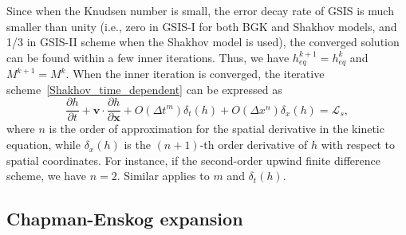 \documentclass[onefignum,onetabnum]{siamart171218}
\begin{document}
Since when the Knudsen number is small, the error decay rate of GSIS is much smaller than unity (i.e., zero in GSIS-I for both BGK and Shakhov models, and 1/3 in GSIS-II scheme when the Shakhov model is used), the converged solution can be found within a few  inner iterations. Thus, we have $h_{eq}^{k+1}=h_{eq}^{k}$ and $M^{k+1}=M^{k}$. When the inner iteration is converged, the iterative scheme~\eqref{Shakhov_time_dependent} can be expressed as
\begin{equation}\label{LBE_GSIS}
\frac{\partial h}{\partial t}
+\bm{v}\cdot\frac{\partial{h}}{\partial\bm{x}}
+O(\Delta{t}^m)\delta_t(h)
+O(\Delta{x}^n)\delta_x(h)
=\mathcal{L}_s,
\end{equation}
where $n$ is the order of approximation for the spatial derivative in the kinetic equation,  while $\delta_x(h)$ is the $(n+1)$-th order derivative of $h$ with respect to spatial coordinates. For instance, if the second-order upwind finite difference scheme, we have $n=2$. 
Similar applies to $m$ and $\delta_t(h)$. 

\subsection{Chapman-Enskog expansion}
\end{document}
